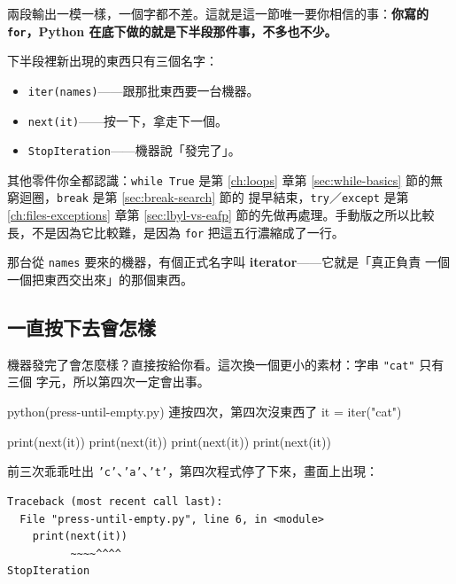 兩段輸出一模一樣，一個字都不差。這就是這一節唯一要你相信的事：\textbf{你寫的
\texttt{for}，Python 在底下做的就是下半段那件事，不多也不少。}

下半段裡新出現的東西只有三個名字：

\begin{itemize}
\item \texttt{iter(names)}——跟那批東西要一台機器。
\item \texttt{next(it)}——按一下，拿走下一個。
\item \texttt{StopIteration}——機器說「發完了」。
\end{itemize}

其他零件你全都認識：\texttt{while True} 是第 \ref{ch:loops} 章第
\ref{sec:while-basics} 節的無窮迴圈，\texttt{break} 是第 \ref{sec:break-search} 節的
提早結束，\texttt{try}／\texttt{except} 是第 \ref{ch:files-exceptions} 章第
\ref{sec:lbyl-vs-eafp} 節的先做再處理。手動版之所以比較長，不是因為它比較難，是因為
\texttt{for} 把這五行濃縮成了一行。

那台從 \texttt{names} 要來的機器，有個正式名字叫 \textbf{iterator}——它就是「真正負責
一個一個把東西交出來」的那個東西。

\subsection*{一直按下去會怎樣}

機器發完了會怎麼樣？直接按給你看。這次換一個更小的素材：字串 \texttt{"cat"} 只有三個
字元，所以第四次一定會出事。

\begin{example}{python}{(press-until-empty.py) 連按四次，第四次沒東西了}
it = iter("cat")

print(next(it))
print(next(it))
print(next(it))
print(next(it))
\end{example}


前三次乖乖吐出 \texttt{'c'}、\texttt{'a'}、\texttt{'t'}，第四次程式停了下來，畫面上出現：

\begin{verbatim}
Traceback (most recent call last):
  File "press-until-empty.py", line 6, in <module>
    print(next(it))
          ~~~~^^^^
StopIteration
\end{verbatim}


